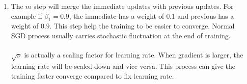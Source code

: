 \documentclass[10pt]{article}
\begin{document}
\begin{enumerate}[label=(\alph*)]
\item
The $m$ step will merge the immediate updates with previous updates.
For example if $\beta_1 = 0.9$, the immediate has a weight of $0.1$ and previous has a weight of $0.9$.
This step help the training to be easier to converge.
Normal SGD process usually carries stochastic fluctuation at the end of training.\\
\\
$\sqrt{\nu}$ is actually a scaling factor for learning rate.
When gradient is larger, the learning rate will be scaled down and vice versa.
This process can give the training faster converge compared to fix learning rate.

\end{enumerate}
\end{document}
